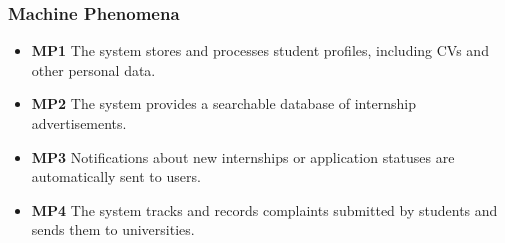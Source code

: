 \subsubsection{Machine Phenomena}
\begin{itemize}
    \item \textbf{MP1} The system stores and processes student profiles, including CVs and other personal data.
    \item \textbf{MP2} The system provides a searchable database of internship advertisements.
    \item \textbf{MP3} Notifications about new internships or application statuses are automatically sent to users.
    \item \textbf{MP4} The system tracks and records complaints submitted by students and sends them to universities.
\end{itemize}


